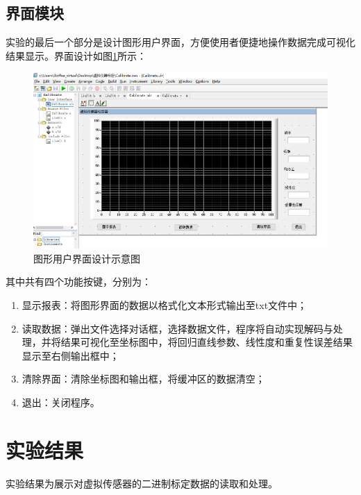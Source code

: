 \documentclass[a4paper,12pt,twoside]{article}%
\begin{document}
\subsection{界面模块}
实验的最后一个部分是设计图形用户界面，方便使用者便捷地操作数据完成可视化结果显示。界面设计如图\ref{fig:ui}所示：
\begin{figure}[H]
  \centering
  \includegraphics[width=\textwidth]{图形用户界面设计示意图.png}
  \caption{图形用户界面设计示意图}
  \label{fig:ui}
\end{figure}
其中共有四个功能按键，分别为：
\begin{enumerate}
  \item 显示报表：将图形界面的数据以格式化文本形式输出至txt文件中；
  \item 读取数据：弹出文件选择对话框，选择数据文件，程序将自动实现解码与处理，并将结果可视化至坐标图中，将回归直线参数、线性度和重复性误差结果显示至右侧输出框中；
  \item 清除界面：清除坐标图和输出框，将缓冲区的数据清空；
  \item 退出：关闭程序。
\end{enumerate}
\newpage
\section{实验结果}
实验结果为展示对虚拟传感器的二进制标定数据的读取和处理。
\end{document}
